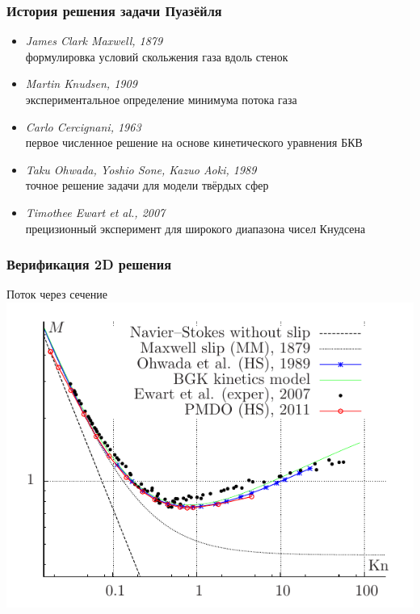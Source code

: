 \documentclass[ucs]{beamer}
\begin{document}
\begin{frame}
	\frametitle{История решения задачи Пуазёйля}
	\begin{itemize}
		\item \textit{James Clark Maxwell, 1879} \\ формулировка условий скольжения газа вдоль стенок \\
		\item \textit{Martin Knudsen, 1909} \\ экспериментальное определение минимума потока газа \\
		\item \textit{Carlo Cercignani, 1963} \\ первое численное решение на основе кинетического уравнения БКВ \\
		\item \textit{Taku Ohwada, Yoshio Sone, Kazuo Aoki, 1989} \\ точное решение задачи для модели твёрдых сфер \\
		\item \textit{Timothee Ewart et al., 2007} \\ прецизионный эксперимент для широкого диапазона чисел Кнудсена \\
	\end{itemize}
\end{frame}

\begin{frame}
	\frametitle{Верификация 2D решения}
	\begin{center}
		Поток через сечение\\
		\includegraphics[width=.8\textwidth]{pics/poiseuille}
	\end{center}
\end{frame}
\end{document}
